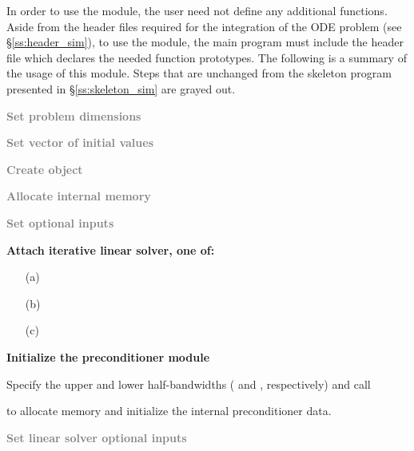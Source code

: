 In order to use the {\cvbandpre} module, the user need not define any
additional functions. 
Aside from the header files required for the integration of the ODE problem
(see \S\ref{ss:header_sim}),  to use the {\cvbandpre} module, the main program 
must include the header file  which declares the needed
function prototypes.
The following is a summary of the usage of this module. Steps that are unchanged
from the skeleton program presented in \S\ref{ss:skeleton_sim} are grayed out.
\begin{Steps}
  
\item
  \textcolor{gray}{\bf Set problem dimensions}

\item
  \textcolor{gray}{\bf Set vector of initial values}
 
\item
  \textcolor{gray}{\bf Create {\cvodes} object}

\item
  \textcolor{gray}{\bf Allocate internal memory}

\item
  \textcolor{gray}{\bf Set optional inputs}

\item \label{i:bandpre_attach}
  {\bf Attach iterative linear solver, one of:}

  \begin{itemize}
  \item[(a) ] 
  \item[(b) ] 
  \item[(c) ] 
  \end{itemize}

\item \label{i:bandpre_init}
  {\bf Initialize the {\cvbandpre} preconditioner module}

  Specify the upper and lower half-bandwidths ( and , respectively) and call 


  to allocate memory and initialize the internal preconditioner data.

\item
  \textcolor{gray}{\bf Set linear solver optional inputs}


\end{Steps}
